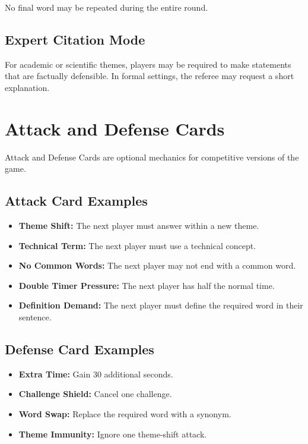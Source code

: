 \documentclass[11pt,a4paper]{article}
\begin{document}
No final word may be repeated during the entire round.

\subsection{Expert Citation Mode}

For academic or scientific themes, players may be required to make statements that are factually defensible. In formal settings, the referee may request a short explanation.

\section{Attack and Defense Cards}

Attack and Defense Cards are optional mechanics for competitive versions of the game.

\subsection{Attack Card Examples}

\begin{itemize}
    \item \textbf{Theme Shift:} The next player must answer within a new theme.
    \item \textbf{Technical Term:} The next player must use a technical concept.
    \item \textbf{No Common Words:} The next player may not end with a common word.
    \item \textbf{Double Timer Pressure:} The next player has half the normal time.
    \item \textbf{Definition Demand:} The next player must define the required word in their sentence.
\end{itemize}

\subsection{Defense Card Examples}

\begin{itemize}
    \item \textbf{Extra Time:} Gain 30 additional seconds.
    \item \textbf{Challenge Shield:} Cancel one challenge.
    \item \textbf{Word Swap:} Replace the required word with a synonym.
    \item \textbf{Theme Immunity:} Ignore one theme-shift attack.
\end{itemize}
\end{document}
